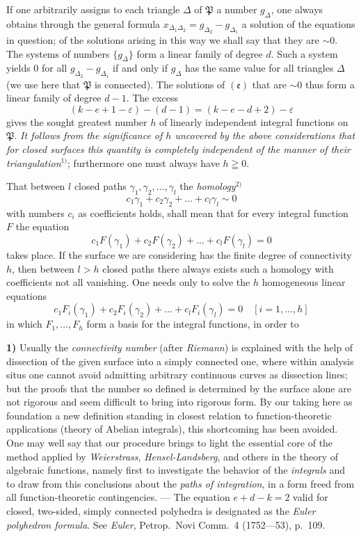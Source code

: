 \documentclass{article}
\begin{document}
If one arbitrarily assigns to each triangle $\Delta$ of $\mathfrak{P}$ a number $g_\Delta$, one always obtains through the general formula $x_{\Delta_1 \Delta_2} = g_{\Delta_2} - g_{\Delta_1}$ a solution of the equations in question; of the solutions arising in this way we shall say that they are $\sim 0$. The systems of numbers $\{g_\Delta\}$ form a linear family of degree $d$. Such a system yields $0$ for all $g_{\Delta_2} - g_{\Delta_1}$ if and only if $g_\Delta$ has the same value for all triangles $\Delta$ (we use here that $\mathfrak{P}$ is connected). The solutions of $(\mathfrak{e})$ that are $\sim 0$ thus form a linear family of degree $d - 1$. The excess
\[ (k - e + 1 - \varepsilon) - (d - 1) = (k - e - d + 2) - \varepsilon \]
gives the sought greatest number $h$ of linearly independent integral functions on $\mathfrak{P}$. \emph{It follows from the significance of $h$ uncovered by the above considerations that for closed surfaces this quantity is completely independent of the manner of their triangulation}${}^{1)}$; furthermore one must always have $h \geqq 0$.

That between $l$ closed paths $\gamma_1, \gamma_2, \dots, \gamma_l$ the \emph{homology}${}^{2)}$
\[ c_1 \gamma_1 + c_2 \gamma_2 + \dots + c_l \gamma_l \sim 0 \]
with numbers $c_i$ as coefficients holds, shall mean that for every integral function $F$ the equation
\[ c_1 F(\gamma_1) + c_2 F(\gamma_2) + \dots + c_l F(\gamma_l) = 0 \]
takes place. If the surface we are considering has the finite degree of connectivity $h$, then between $l > h$ closed paths there always exists such a homology with coefficients not all vanishing. One needs only to solve the $h$ homogeneous linear equations
\[ c_1 F_i(\gamma_1) + c_2 F_i(\gamma_2) + \dots + c_l F_i(\gamma_l) = 0 \quad [i = 1, \dots, h] \]
in which $F_1, \dots, F_h$ form a basis for the integral functions, in order to

\textbf{1)} Usually the \emph{connectivity number} (after \emph{Riemann}) is explained with the help of dissection of the given surface into a simply connected one, where within analysis situs one cannot avoid admitting arbitrary continuous curves as dissection lines; but the proofs that the number so defined is determined by the surface alone are not rigorous and seem difficult to bring into rigorous form. By our taking here as foundation a new definition standing in closest relation to function-theoretic applications (theory of Abelian integrals), this shortcoming has been avoided. One may well say that our procedure brings to light the essential core of the method applied by \emph{Weierstrass}, \emph{Hensel-Landsberg}, and others in the theory of algebraic functions, namely first to investigate the behavior of the \emph{integrals} and to draw from this conclusions about the \emph{paths of integration}, in a form freed from all function-theoretic contingencies. --- The equation $e + d - k = 2$ valid for closed, two-sided, simply connected polyhedra is designated as the \emph{Euler polyhedron formula}. See \emph{Euler}, Petrop.\ Novi Comm.\ 4 (1752---53), p.~109.
\end{document}
